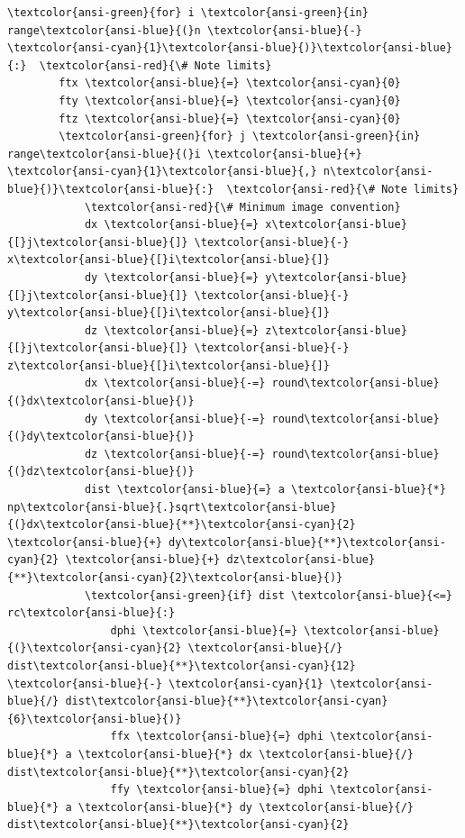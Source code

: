 \documentclass[11pt]{article}
\begin{document}
\begin{Verbatim}[commandchars=\\\{\}]
    \textcolor{ansi-green}{for} i \textcolor{ansi-green}{in} range\textcolor{ansi-blue}{(}n \textcolor{ansi-blue}{-} \textcolor{ansi-cyan}{1}\textcolor{ansi-blue}{)}\textcolor{ansi-blue}{:}  \textcolor{ansi-red}{\# Note limits}
        ftx \textcolor{ansi-blue}{=} \textcolor{ansi-cyan}{0}
        fty \textcolor{ansi-blue}{=} \textcolor{ansi-cyan}{0}
        ftz \textcolor{ansi-blue}{=} \textcolor{ansi-cyan}{0}
        \textcolor{ansi-green}{for} j \textcolor{ansi-green}{in} range\textcolor{ansi-blue}{(}i \textcolor{ansi-blue}{+} \textcolor{ansi-cyan}{1}\textcolor{ansi-blue}{,} n\textcolor{ansi-blue}{)}\textcolor{ansi-blue}{:}  \textcolor{ansi-red}{\# Note limits}
            \textcolor{ansi-red}{\# Minimum image convention}
            dx \textcolor{ansi-blue}{=} x\textcolor{ansi-blue}{[}j\textcolor{ansi-blue}{]} \textcolor{ansi-blue}{-} x\textcolor{ansi-blue}{[}i\textcolor{ansi-blue}{]}
            dy \textcolor{ansi-blue}{=} y\textcolor{ansi-blue}{[}j\textcolor{ansi-blue}{]} \textcolor{ansi-blue}{-} y\textcolor{ansi-blue}{[}i\textcolor{ansi-blue}{]}
            dz \textcolor{ansi-blue}{=} z\textcolor{ansi-blue}{[}j\textcolor{ansi-blue}{]} \textcolor{ansi-blue}{-} z\textcolor{ansi-blue}{[}i\textcolor{ansi-blue}{]}
            dx \textcolor{ansi-blue}{-=} round\textcolor{ansi-blue}{(}dx\textcolor{ansi-blue}{)}
            dy \textcolor{ansi-blue}{-=} round\textcolor{ansi-blue}{(}dy\textcolor{ansi-blue}{)}
            dz \textcolor{ansi-blue}{-=} round\textcolor{ansi-blue}{(}dz\textcolor{ansi-blue}{)}
            dist \textcolor{ansi-blue}{=} a \textcolor{ansi-blue}{*} np\textcolor{ansi-blue}{.}sqrt\textcolor{ansi-blue}{(}dx\textcolor{ansi-blue}{**}\textcolor{ansi-cyan}{2} \textcolor{ansi-blue}{+} dy\textcolor{ansi-blue}{**}\textcolor{ansi-cyan}{2} \textcolor{ansi-blue}{+} dz\textcolor{ansi-blue}{**}\textcolor{ansi-cyan}{2}\textcolor{ansi-blue}{)}
            \textcolor{ansi-green}{if} dist \textcolor{ansi-blue}{<=} rc\textcolor{ansi-blue}{:}
                dphi \textcolor{ansi-blue}{=} \textcolor{ansi-blue}{(}\textcolor{ansi-cyan}{2} \textcolor{ansi-blue}{/} dist\textcolor{ansi-blue}{**}\textcolor{ansi-cyan}{12} \textcolor{ansi-blue}{-} \textcolor{ansi-cyan}{1} \textcolor{ansi-blue}{/} dist\textcolor{ansi-blue}{**}\textcolor{ansi-cyan}{6}\textcolor{ansi-blue}{)}
                ffx \textcolor{ansi-blue}{=} dphi \textcolor{ansi-blue}{*} a \textcolor{ansi-blue}{*} dx \textcolor{ansi-blue}{/} dist\textcolor{ansi-blue}{**}\textcolor{ansi-cyan}{2}
                ffy \textcolor{ansi-blue}{=} dphi \textcolor{ansi-blue}{*} a \textcolor{ansi-blue}{*} dy \textcolor{ansi-blue}{/} dist\textcolor{ansi-blue}{**}\textcolor{ansi-cyan}{2}

\end{Verbatim}
\end{document}
